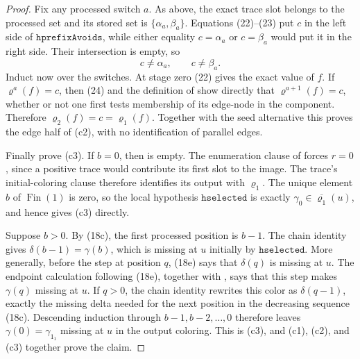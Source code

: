 \begin{proof}
Fix any processed switch \(a\).  As above, the exact trace slot belongs
to the processed set and its stored set is
\(\{\alpha_a,\beta_a\}\).  Equations (22)--(23) put \(c\) in the left
side of \(\mathtt{hprefixAvoids}\), while either equality
\(c=\alpha_a\) or \(c=\beta_a\) would put it in the right side.  Their
intersection is empty, so
\[
                       c\ne\alpha_a,\qquad c\ne\beta_a.      \tag{24}
\]
Induct now over the switches.  At stage zero (22) gives the exact value
of \(f\).  If \(\varrho^a(f)=c\), then (24) and the definition of
 show directly that
\(\varrho^{a+1}(f)=c\), whether or not one first tests membership of its
edge-node in the component.  Therefore
\(\varrho_2(f)=c=\varrho_1(f)\).  Together with the seed alternative this
proves the edge half of (c2), with no identification of parallel edges.

Finally prove (c3).  If \(b=0\), then
 is empty.  The enumeration clause
of  forces \(r=0\), since a
positive trace would contribute its first slot to the image.  The trace's
initial-coloring clause therefore identifies its output with
\(\varrho_1\).  The unique element \(b\) of \(\operatorname{Fin}(1)\) is
zero, so the local hypothesis \(\mathtt{hselected}\) is exactly
\(\gamma_0\in\overline{\varrho_1}(u)\), and hence gives (c3) directly.

Suppose \(b>0\).  By (18c), the first processed position is \(b-1\).
The chain identity gives
\(\delta(b-1)=\gamma(b)\), which is missing at \(u\) initially by
\(\mathtt{hselected}\).  More generally, before the step at position
\(q\), (18e) says that \(\delta(q)\) is missing at \(u\).  The endpoint
calculation following (18e), together with
, says that this step makes
\(\gamma(q)\) missing at \(u\).  If \(q>0\), the chain identity rewrites
this color as \(\delta(q-1)\), exactly the missing delta needed for the
next position in the decreasing sequence (18c).  Descending induction
through \(b-1,b-2,\ldots,0\) therefore leaves
\(\gamma(0)=\gamma_{1_1}\) missing at \(u\) in the output coloring.
This is (c3), and (c1), (c2), and (c3) together prove the claim.
\end{proof}
